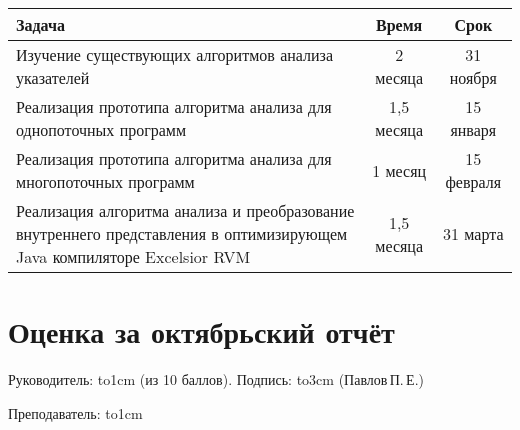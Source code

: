\documentclass[14pt,titlepage]{extarticle}
\newcommand{\underscore}[1]{\hbox to#1{\hrulefill}}
\begin{document}
    \begin{center}
      \begin{tabular}{|p{10.5cm}|c|c|}\hline
        \textbf{Задача}                       &\textbf{Время} & \textbf{Срок}\\
        \hline
        Изучение существующих алгоритмов анализа указателей
                                              & 2 месяца    & 31 ноября \\
        \hline
        Реализация прототипа алгоритма анализа для однопоточных программ
                                              & 1,5 месяца  & 15 января \\
        \hline
        Реализация прототипа алгоритма анализа для многопоточных программ
                                              & 1 месяц     & 15 февраля \\
        \hline
        Реализация алгоритма анализа и преобразование внутреннего представления
        в оптимизирующем Java компиляторе Excelsior RVM
                                              & 1,5 месяца  & 31 марта \\
        \hline
      \end{tabular}
    \end{center}



  \newpage
  \thispagestyle{empty}
  \pagestyle{empty}
  \section*{Оценка за октябрьский отчёт}

    Руководитель: \underscore{1cm} (из 10 баллов).
    Подпись: \underscore{3cm} (Павлов\,П.\,Е.)

    \vspace{0.5cm}
    Преподаватель: \underscore{1cm}
\end{document}
